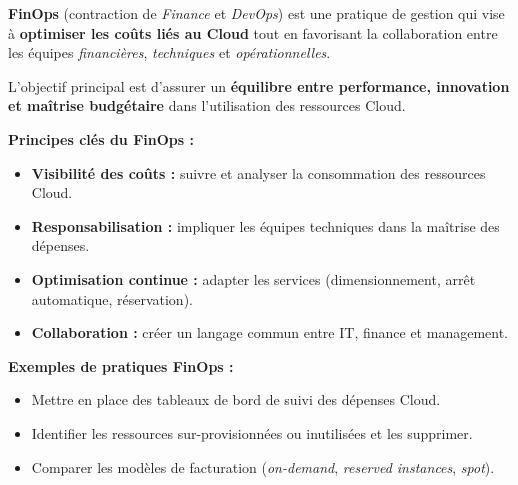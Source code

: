\documentclass[a4paper,11pt]{article}
\begin{document}
\begin{tcolorbox}[colback=purple!5,colframe=purple!60!black,title=Qu'est-ce que le FinOps ?]

\textbf{FinOps} (contraction de \textit{Finance} et \textit{DevOps}) est une pratique de gestion qui vise à 
\textbf{optimiser les coûts liés au Cloud} tout en favorisant la collaboration entre les équipes 
\textit{financières}, \textit{techniques} et \textit{opérationnelles}.  

L’objectif principal est d’assurer un \textbf{équilibre entre performance, innovation et maîtrise budgétaire} 
dans l’utilisation des ressources Cloud.  

\medskip
\textbf{Principes clés du FinOps :}
\begin{itemize}
  \item \textbf{Visibilité des coûts :} suivre et analyser la consommation des ressources Cloud.
  \item \textbf{Responsabilisation :} impliquer les équipes techniques dans la maîtrise des dépenses.
  \item \textbf{Optimisation continue :} adapter les services (dimensionnement, arrêt automatique, réservation).
  \item \textbf{Collaboration :} créer un langage commun entre IT, finance et management.
\end{itemize}

\medskip
\textbf{Exemples de pratiques FinOps :}
\begin{itemize}
  \item Mettre en place des tableaux de bord de suivi des dépenses Cloud.
  \item Identifier les ressources sur-provisionnées ou inutilisées et les supprimer.
  \item Comparer les modèles de facturation (\textit{on-demand}, \textit{reserved instances}, \textit{spot}).
\end{itemize}

\end{tcolorbox}
\end{document}
